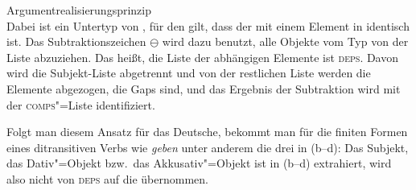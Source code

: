 \eas
Argumentrealisierungsprinzip \citep*[]{BMS2001a}\\[2pt]
 \impl {} 
\zs
Dabei ist  ein Untertyp von , für den gilt, dass der \localw mit einem
Element in \slasch identisch ist. Das Subtraktionszeichen $\ominus$\is{$\ominus$}\isrel{$\ominus$} wird dazu benutzt, alle Objekte
vom Typ  von der Liste  abzuziehen. Das heißt, die Liste der abhängigen
Elemente ist \textsc{deps}. Davon wird die Subjekt-Liste  abgetrennt und von der restlichen Liste 
werden die Elemente abgezogen, die Gaps sind, und das Ergebnis der Subtraktion wird mit der
\textsc{comps}"=Liste identifiziert.


Folgt man diesem Ansatz für das Deutsche, bekommt man für die finiten Formen eines ditransitiven Verbs wie \emph{geben} 
unter anderem die drei \compslen in (b--d):
\eal
\ex {}
\ex {}
\ex {}
\ex {}
\zl
Das Subjekt, das Dativ"=Objekt bzw.\ das Akkusativ"=Objekt ist in (b--d) extrahiert, wird
also nicht von \textsc{deps} auf die \compsl übernommen.
\largerpage

